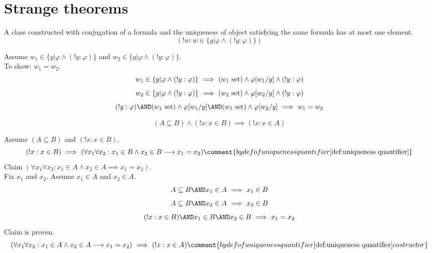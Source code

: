 \def\topic{}

\section{Strange theorems}
\begin{theorem}
A class constructed with conjugation of a formula and the uniqueness of object satisfying the same formula has at most one element.
\label{thm:class with at most one object}
\[
(!w:w\in \{y|\varphi\land (!y:\varphi)\})
\]
\end{theorem}
\Proof
Assume $w_1\in \{y|\varphi\land (!y:\varphi)\}$ and $w_2\in \{y|\varphi\land (!y:\varphi)\}$.\\
To show: $w_1=w_2$.
\[
w_1\in \{y|\varphi\land (!y:\varphi)\}
\ \Longrightarrow\ 
(w_1\mathrm{\ set})
\land
\varphi[w_1/y]
\land
(!y:\varphi)
\]
\[
w_2\in \{y|\varphi\land (!y:\varphi)\}
\ \Longrightarrow\ 
(w_2\mathrm{\ set})
\land
\varphi[w_2/y]
\land
(!y:\varphi)
\]
\[
(!y:\varphi)
\AND
(w_1\set)\land\varphi[w_1/y]
\AND
(w_1\set)\land\varphi[w_2/y]
\IMPLIES
w_1=w_2
\]
\Done

\begin{theorem}
\[
(A\subseteq B)\land(!x:x\in B)\implies (!x:x\in A)
\]
\end{theorem}
\Proof
Assume $(A\subseteq B)$ and $(!x:x\in B)$.
\[
(!x:x\in B)
\IMPLIES
(\forall x_1\forall x_2: x_1\in B \land x_2\in B \implies x_1=x_2)
\comment{by def of uniqueness quantifier \ref{def:uniqueness quantifier}}
\]
Claim $(\forall x_1\forall x_2: x_1\in A \land x_2\in A \implies x_1=x_2)$.\\
Fix $x_1$ and $x_2$.
Assume $x_1\in A$ and $x_2\in A$. 
\[
A\subseteq B
\AND
x_1\in A
\IMPLIES
x_1\in B
\]
\[
A\subseteq B
\AND
x_2\in A
\IMPLIES
x_2\in B
\]
\[
(!x:x\in B)
\AND
x_1\in B
\AND
x_2\in B
\IMPLIES
x_1=x_2
\]
Claim is proven.
\[
(\forall x_1\forall x_2: x_1\in A \land x_2\in A \implies x_1=x_2)
\IMPLIES
(!x:x\in A)
\comment{by def of uniqueness quantifier \ref{def:uniqueness quantifier} costructor}
\]
\Done

